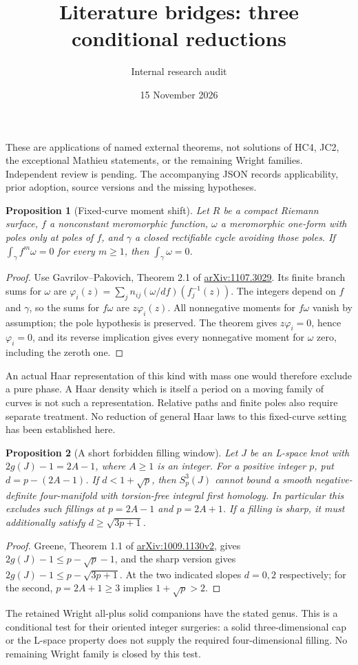 \documentclass[11pt]{article}
\title{Literature bridges: three conditional reductions}
\author{Internal research audit}
\date{15 November 2026}
\newtheorem{proposition}{Proposition}
\begin{document}
\maketitle
These are applications of named external theorems, not solutions of HC4, JC2,
the exceptional Mathieu statements, or the remaining Wright families.
Independent review is pending. The accompanying JSON records applicability,
prior adoption, source versions and the missing hypotheses.

\begin{proposition}[Fixed-curve moment shift]
Let $R$ be a compact Riemann surface, $f$ a nonconstant meromorphic function,
$\omega$ a meromorphic one-form with poles only at poles of $f$, and $\gamma$
a closed rectifiable cycle avoiding those poles. If
$\int_\gamma f^m\omega=0$ for every $m\geq1$, then
$\int_\gamma\omega=0$.
\end{proposition}
\begin{proof}
Use Gavrilov--Pakovich, Theorem 2.1 of
\href{https://arxiv.org/abs/1107.3029}{arXiv:1107.3029}.
Its finite branch sums for $\omega$ are
$\varphi_i(z)=\sum_j n_{ij}(\omega/df)(f_j^{-1}(z))$.
The integers depend on $f$ and $\gamma$, so the sums for $f\omega$ are
$z\varphi_i(z)$. All nonnegative moments for $f\omega$ vanish by assumption;
the pole hypothesis is preserved. The theorem gives $z\varphi_i=0$, hence
$\varphi_i=0$, and its reverse implication gives every nonnegative moment
for $\omega$ zero, including the zeroth one.
\end{proof}
An actual Haar representation of this kind with mass one would therefore
exclude a pure phase. A Haar density which is itself a period on a moving
family of curves is not such a representation. Relative paths and finite
poles also require separate treatment. No reduction of general Haar laws
to this fixed-curve setting has been established here.

\begin{proposition}[A short forbidden filling window]
Let $J$ be an L-space knot with $2g(J)-1=2A-1$, where $A\geq1$ is an integer.
For a positive integer $p$, put $d=p-(2A-1)$. If $d<1+\sqrt p$, then
$S^3_p(J)$ cannot bound a smooth negative-definite four-manifold with
torsion-free integral first homology. In particular this excludes such
fillings at $p=2A-1$ and $p=2A+1$. If a filling is sharp, it must additionally
satisfy $d\geq\sqrt{3p+1}$.
\end{proposition}
\begin{proof}
Greene, Theorem 1.1 of
\href{https://arxiv.org/abs/1009.1130v2}{arXiv:1009.1130v2}, gives
$2g(J)-1\leq p-\sqrt p-1$, and the sharp version gives
$2g(J)-1\leq p-\sqrt{3p+1}$.
At the two indicated slopes $d=0,2$ respectively; for the second,
$p=2A+1\geq3$ implies $1+\sqrt p>2$.
\end{proof}
The retained Wright all-plus solid companions have the stated genus.
This is a conditional test for their oriented integer surgeries: a solid
three-dimensional cap or the L-space property does not supply the required
four-dimensional filling. No remaining Wright family is closed by this test.
\end{document}
